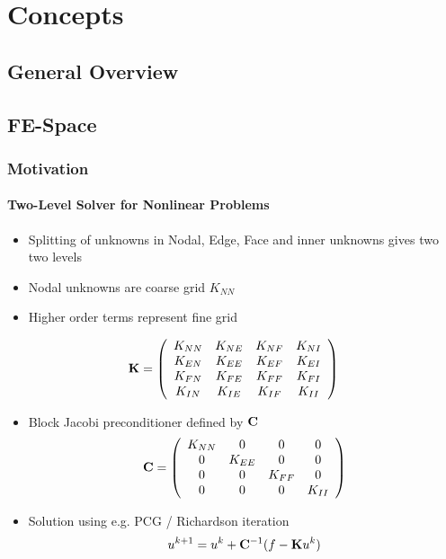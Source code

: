 \chapter{Concepts}

\section{General Overview}

\section{FE-Space}

\subsection{Motivation}
\subsubsection{Two-Level Solver for Nonlinear Problems}
\begin{itemize} 
\item Splitting of unknowns in Nodal, Edge, Face and inner unknowns gives two
two levels
\item Nodal unknowns are coarse grid $K_{NN}$
\item Higher order terms represent fine grid
\end{itemize}
\begin{equation}
{\bf K} = \left(
\begin{array}{cccc}
K_{NN} & K_{NE} & K_{NF} & K_{NI} \\
K_{EN} & K_{EE} & K_{EF} & K_{EI} \\
K_{FN} & K_{FE} & K_{FF} & K_{FI} \\
K_{IN} & K_{IE} & K_{IF} & K_{II} \\
\end{array} \right)
\end{equation}

 \begin{itemize}
  \item Block Jacobi preconditioner defined by ${\bf C}$
\[ \displaystyle
{\bf C} = \left(
\begin{array}{cccc}
K_{NN} & 0 & 0 & 0 \\
0 & K_{EE} & 0 & 0 \\
0 & 0 & K_{FF} & 0 \\
0 & 0 & 0 & K_{II} \\
\end{array} \right)
\]
\item Solution using e.g. PCG / Richardson iteration
\[ \displaystyle
 u^{k+1} = u^k + {\bf C}^{-1} (f-{\bf K}u^k)
\]
 \end{itemize}

